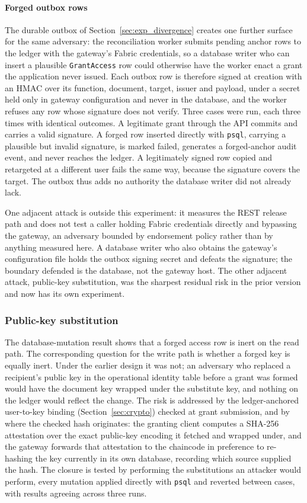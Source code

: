 \documentclass[preprint,12pt]{elsarticle}
\begin{document}
\paragraph{Forged outbox rows}
The durable outbox of Section~\ref{sec:exp_divergence} creates one further
surface for the same adversary: the reconciliation worker submits pending
anchor rows to the ledger with the gateway's Fabric credentials, so a database
writer who can insert a plausible \texttt{GrantAccess} row could otherwise
have the worker enact a grant the application never issued. Each outbox row is
therefore signed at creation with an HMAC over its function, document, target,
issuer and payload, under a secret held only in gateway configuration and
never in the database, and the worker refuses any row whose signature does not
verify. Three cases were run, each three times with identical outcomes. A
legitimate grant through the API commits and carries a valid signature. A
forged row inserted directly with \texttt{psql}, carrying a plausible but
invalid signature, is marked failed, generates a forged-anchor audit event,
and never reaches the ledger. A legitimately signed row copied and retargeted
at a different user fails the same way, because the signature covers the
target. The outbox thus adds no authority the database writer did not already
lack.

One adjacent attack is outside this experiment: it measures the REST release
path and does not test a caller holding Fabric credentials directly and
bypassing the gateway, an adversary bounded by endorsement policy rather than by
anything measured here. A database writer who also obtains the gateway's
configuration file holds the outbox signing secret and defeats the signature;
the boundary defended is the database, not the gateway host. The other adjacent attack, public-key substitution, was
the sharpest residual risk in the prior version and now has its own experiment.

\subsubsection{Public-key substitution}
\label{sec:exp_pubkey}

The database-mutation result shows that a forged access row is inert on the
read path. The corresponding question for the write path is whether a forged
key is equally inert. Under the earlier design it was not; an adversary who
replaced a recipient's public key in the operational identity table before a
grant was formed would have the document key wrapped under the substitute key,
and nothing on the ledger would reflect the change. The risk is addressed by
the ledger-anchored user-to-key binding (Section~\ref{sec:crypto}) checked at
grant submission, and by where the checked hash originates: the granting
client computes a SHA-256 attestation over the exact public-key encoding it
fetched and wrapped under, and the gateway forwards that attestation to the
chaincode in preference to re-hashing the key currently in its own database,
recording which source supplied the hash. The closure is tested by performing
the substitutions an attacker would perform, every mutation applied directly
with \texttt{psql} and reverted between cases, with results agreeing across
three runs.
\end{document}
